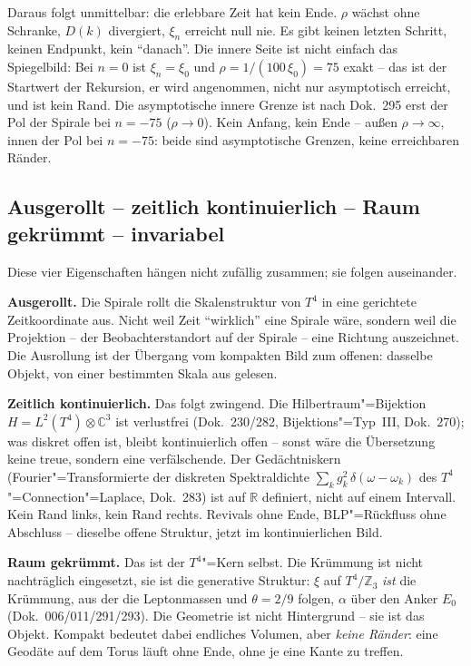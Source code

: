 Daraus folgt unmittelbar: die erlebbare Zeit hat kein Ende. $\rho$ wächst
ohne Schranke, $D(k)$ divergiert, $\xi_n$ erreicht null nie. Es gibt keinen
letzten Schritt, keinen Endpunkt, kein \enquote{danach}. Die innere Seite
ist nicht einfach das Spiegelbild: Bei $n=0$ ist $\xi_n=\xi_0$ und
$\rho=1/(100\,\xi_0)=75$ exakt -- das ist der Startwert der Rekursion, er wird
angenommen, nicht nur asymptotisch erreicht, und ist kein Rand. Die
asymptotische innere Grenze ist nach Dok.~295 erst der Pol der Spirale bei
$n=-75$ ($\rho\to0$). Kein Anfang, kein Ende -- außen $\rho\to\infty$, innen
der Pol bei $n=-75$: beide sind asymptotische Grenzen, keine erreichbaren
Ränder.

\subsection*{Ausgerollt -- zeitlich kontinuierlich -- Raum gekrümmt --
invariabel}

Diese vier Eigenschaften hängen nicht zufällig zusammen; sie folgen
auseinander.

\textbf{Ausgerollt.} Die Spirale rollt die Skalenstruktur von $T^4$ in eine
gerichtete Zeitkoordinate aus. Nicht weil Zeit \enquote{wirklich} eine
Spirale wäre, sondern weil die Projektion -- der Beobachterstandort auf der
Spirale -- eine Richtung auszeichnet. Die Ausrollung ist der Übergang vom
kompakten Bild zum offenen: dasselbe Objekt, von einer bestimmten Skala aus
gelesen.

\textbf{Zeitlich kontinuierlich.} Das folgt zwingend. Die Hilbertraum"=Bijektion
$H = L^2(T^4) \otimes \mathbb{C}^3$ ist verlustfrei (Dok.~230/282,
Bijektions"=Typ~III, Dok.~270); was diskret offen ist, bleibt kontinuierlich
offen -- sonst wäre die Übersetzung keine treue, sondern eine verfälschende.
Der Gedächtniskern (Fourier"=Transformierte der diskreten Spektraldichte
$\sum_k g_k^2\,\delta(\omega - \omega_k)$ des $T^4$"=Connection"=Laplace,
Dok.~283) ist auf $\mathbb{R}$ definiert, nicht auf einem Intervall. Kein
Rand links, kein Rand rechts. Revivals ohne Ende, BLP"=Rückfluss ohne
Abschluss -- dieselbe offene Struktur, jetzt im kontinuierlichen Bild.

\textbf{Raum gekrümmt.} Das ist der $T^4$"=Kern selbst. Die Krümmung ist
nicht nachträglich eingesetzt, sie ist die generative Struktur: $\xi$ auf
$T^4/\mathbb{Z}_3$ \emph{ist} die Krümmung, aus der die Leptonmassen und $\theta = 2/9$
folgen, $\alpha$ über den Anker $E_0$ (Dok.~006/011/291/293). Die Geometrie ist nicht
Hintergrund -- sie ist das Objekt. Kompakt bedeutet dabei endliches Volumen,
aber \emph{keine Ränder}: eine Geodäte auf dem Torus läuft ohne Ende, ohne je
eine Kante zu treffen.

